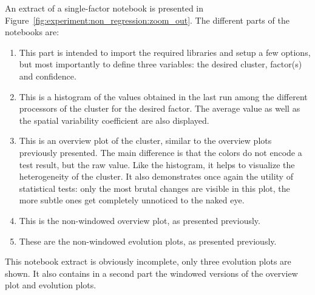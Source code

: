                 An extract of a single-factor notebook is presented in
                Figure~\ref{fig:experiment:non_regression:zoom_out}. The different parts of the notebooks are:
                \begin{enumerate}[label=\alph*]
                    \item This part is intended to import the required libraries and setup a few options, but most
                        importantly to define three variables: the desired cluster, factor(s) and confidence.
                    \item This is a histogram of the values obtained in the last run among the different processors of
                        the cluster for the desired factor. The average value as well as the spatial variability
                        coefficient are also displayed.
                    \item This is an overview plot of the cluster, similar to the overview plots previously presented.
                        The main difference is that the colors do not encode a test result, but the raw value. Like the
                        histogram, it helps to visualize the heterogeneity of the cluster. It also demonstrates once
                        again the utility of statistical tests: only the most brutal changes are visible in this plot,
                        the more subtle ones get completely unnoticed to the naked eye.
                    \item This is the non-windowed overview plot, as presented previously.
                    \item These are the non-windowed evolution plots, as presented previously.
                \end{enumerate}
                This notebook extract is obviously incomplete, only three evolution plots are shown. It also contains in
                a second part the windowed versions of the overview plot and evolution plots.

